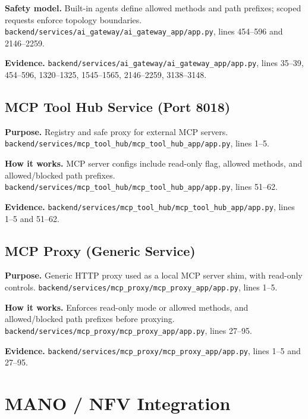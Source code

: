 \documentclass[10pt,a4paper]{article}
\begin{document}
\textbf{Safety model.} Built-in agents define allowed methods and path prefixes; scoped requests enforce topology boundaries. \texttt{backend/services/ai\_gateway/ai\_gateway\_app/app.py}, lines 454--596 and 2146--2259.

\textbf{Evidence.} \texttt{backend/services/ai\_gateway/ai\_gateway\_app/app.py}, lines 35--39, 454--596, 1320--1325, 1545--1565, 2146--2259, 3138--3148.

\subsection{MCP Tool Hub Service (Port 8018)}

\textbf{Purpose.} Registry and safe proxy for external MCP servers. \texttt{backend/services/mcp\_tool\_hub/mcp\_tool\_hub\_app/app.py}, lines 1--5.

\textbf{How it works.} MCP server configs include read-only flag, allowed methods, and allowed/blocked path prefixes. \texttt{backend/services/mcp\_tool\_hub/mcp\_tool\_hub\_app/app.py}, lines 51--62.

\textbf{Evidence.} \texttt{backend/services/mcp\_tool\_hub/mcp\_tool\_hub\_app/app.py}, lines 1--5 and 51--62.

\subsection{MCP Proxy (Generic Service)}

\textbf{Purpose.} Generic HTTP proxy used as a local MCP server shim, with read-only controls. \texttt{backend/services/mcp\_proxy/mcp\_proxy\_app/app.py}, lines 1--5.

\textbf{How it works.} Enforces read-only mode or allowed methods, and allowed/blocked path prefixes before proxying. \texttt{backend/services/mcp\_proxy/mcp\_proxy\_app/app.py}, lines 27--95.

\textbf{Evidence.} \texttt{backend/services/mcp\_proxy/mcp\_proxy\_app/app.py}, lines 1--5 and 27--95.

\section{MANO / NFV Integration}
\end{document}
